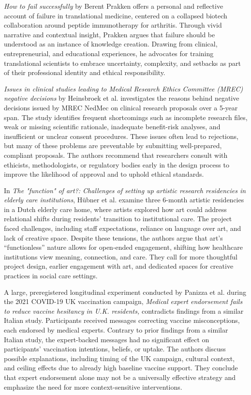 \documentclass[authordate, empirical, issue]{jote-new-article}
\begin{document}
	\emph{How to fail successfully} by Berent Prakken offers a personal and reflective account of failure in translational medicine, centered on a collapsed biotech collaboration around peptide immunotherapy for arthritis. Through vivid narrative and contextual insight, Prakken argues that failure should be understood as an instance of knowledge creation. Drawing from clinical, entrepreneurial, and educational experiences, he advocates for training translational scientists to embrace uncertainty, complexity, and setbacks as part of their professional identity and ethical responsibility.



	\emph{Issues in clinical studies leading to Medical Research Ethics Committee (MREC) negative decisions} by Heinsbroek et al. investigates the reasons behind negative decisions issued by MREC NedMec on clinical research proposals over a 5-year span. The study identifies frequent shortcomings such as incomplete research files, weak or missing scientific rationale, inadequate benefit-risk analyses, and insufficient or unclear consent procedures. These issues often lead to rejections, but many of these problems are preventable by submitting well-prepared, compliant proposals. The authors recommend that researchers consult with ethicists, methodologists, or regulatory bodies early in the design process to improve the likelihood of approval and to uphold ethical standards.



	In \emph{The "function" of art?: Challenges of setting up artistic research residencies in elderly care institutions}, Hübner et al. examine three 6-month artistic residencies in a Dutch elderly care home, where artists explored how art could address relational shifts during residents' transition to institutional care. The project faced challenges, including staff expectations, reliance on language over art, and lack of creative space. Despite these tensions, the authors argue that art's “functionless” nature allows for open-ended engagement, shifting how healthcare institutions view meaning, connection, and care. They call for more thoughtful project design, earlier engagement with art, and dedicated spaces for creative practices in social care settings.



	A large, preregistered longitudinal experiment conducted by Panizza et al. during the 2021 COVID-19 UK vaccination campaign, \emph{Medical expert endorsement fails to reduce vaccine hesitancy in U.K. residents,} contradicts findings from a similar Italian study. Participants received messages correcting vaccine misconceptions, each endorsed by medical experts. Contrary to prior findings from a similar Italian study, the expert-backed messages had no significant effect on participants' vaccination intentions, beliefs, or uptake. The authors discuss possible explanations, including timing of the UK campaign, cultural context, and ceiling effects due to already high baseline vaccine support. They conclude that expert endorsement alone may not be a universally effective strategy and emphasize the need for more context-sensitive interventions.
\end{document}
